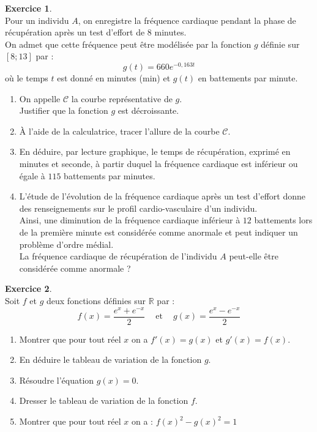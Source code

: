 \documentclass[twocolumn,10pt]{article}
\theoremstyle{definition}
\theoremstyle{definition}
\theoremstyle{definition}
\theoremstyle{definition}
\theoremstyle{definition}
\theoremstyle{definition}
\theoremstyle{definition}
\newtheorem{exercice}{Exercice}
\theoremstyle{definition}
\theoremstyle{definition}
\theoremstyle{definition}
\theoremstyle{definition}
\theoremstyle{definition}
\theoremstyle{definition}
\theoremstyle{definition}
\theoremstyle{definition}
\theoremstyle{definition}
\theoremstyle{definition}
\theoremstyle{definition}
\begin{document}
\begin{exercice}~\\
Pour un individu $A$, on enregistre la fréquence cardiaque pendant la phase de récupération après un test d'effort de 8 minutes. \\
On admet que cette fréquence peut être modélisée par la fonction $g$ définie sur $[8;13]$ par : $$g(t)=660e^{-0,163t}$$
où le temps $t$ est donné en minutes (min) et $g(t)$ en battements par minute.
\begin{enumerate}
\item On appelle $\mathcal{C}$ la courbe représentative de $g$. \\
Justifier que la fonction $g$ est décroissante. 
\item À l'aide de la calculatrice, tracer l'allure de la courbe $\mathcal{C}$. 
\item En déduire, par lecture graphique, le temps de récupération, exprimé en minutes et seconde, à partir duquel la fréquence cardiaque est inférieur ou égale à $115$ battements par minutes. 
\item L'étude de l'évolution de la fréquence cardiaque après un test d'effort donne des renseignements sur le profil cardio-vasculaire d'un individu. \\
Ainsi, une diminution de la fréquence cardiaque inférieur à $12$ battements lors de la première minute est considérée comme anormale et peut indiquer un problème d'ordre médial. \\
La fréquence cardiaque de récupération de l'individu $A$ peut-elle être considérée comme anormale ?
\end{enumerate}   
\end{exercice}

\begin{exercice}~\\
Soit $f$ et $g$ deux fonctions définies sur $\mathbb{R}$ par : $$f(x)=\dfrac{e^x+e^{-x}}{2}~~~~\text{ et }~~~~g(x)=\dfrac{e^x-e^{-x}}{2}$$
\begin{enumerate}
\item Montrer que pour tout réel $x$ on a $f'(x)=g(x)$ et $g'(x)=f(x)$. 
\item En déduire le tableau de variation de la fonction $g$. 
\item Résoudre l'équation $g(x)=0$. 
\item Dresser le tableau de variation de la fonction $f$. 
\item Montrer que pour tout réel $x$ on a : $f(x)^2-g(x)^2=1$
\end{enumerate}
\end{exercice}
\end{document}
